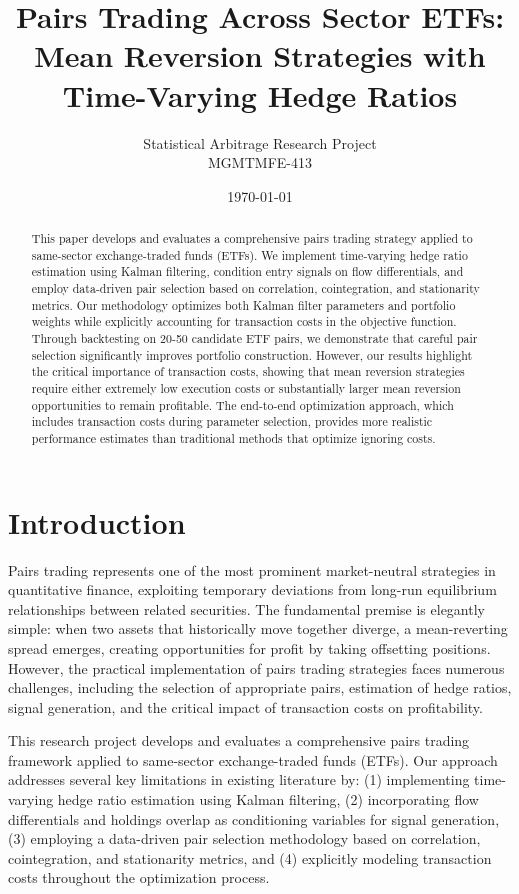\documentclass[12pt]{article}
\title{Pairs Trading Across Sector ETFs: Mean Reversion Strategies with Time-Varying Hedge Ratios}
\author{Statistical Arbitrage Research Project\\MGMTMFE-413}
\date{\today}
\begin{document}
\maketitle

\begin{abstract}
This paper develops and evaluates a comprehensive pairs trading strategy applied to same-sector exchange-traded funds (ETFs). We implement time-varying hedge ratio estimation using Kalman filtering, condition entry signals on flow differentials, and employ data-driven pair selection based on correlation, cointegration, and stationarity metrics. Our methodology optimizes both Kalman filter parameters and portfolio weights while explicitly accounting for transaction costs in the objective function. Through backtesting on 20-50 candidate ETF pairs, we demonstrate that careful pair selection significantly improves portfolio construction. However, our results highlight the critical importance of transaction costs, showing that mean reversion strategies require either extremely low execution costs or substantially larger mean reversion opportunities to remain profitable. The end-to-end optimization approach, which includes transaction costs during parameter selection, provides more realistic performance estimates than traditional methods that optimize ignoring costs.
\end{abstract}

\section{Introduction}

Pairs trading represents one of the most prominent market-neutral strategies in quantitative finance, exploiting temporary deviations from long-run equilibrium relationships between related securities. The fundamental premise is elegantly simple: when two assets that historically move together diverge, a mean-reverting spread emerges, creating opportunities for profit by taking offsetting positions. However, the practical implementation of pairs trading strategies faces numerous challenges, including the selection of appropriate pairs, estimation of hedge ratios, signal generation, and the critical impact of transaction costs on profitability.

This research project develops and evaluates a comprehensive pairs trading framework applied to same-sector exchange-traded funds (ETFs). Our approach addresses several key limitations in existing literature by: (1) implementing time-varying hedge ratio estimation using Kalman filtering, (2) incorporating flow differentials and holdings overlap as conditioning variables for signal generation, (3) employing a data-driven pair selection methodology based on correlation, cointegration, and stationarity metrics, and (4) explicitly modeling transaction costs throughout the optimization process.
\end{document}
